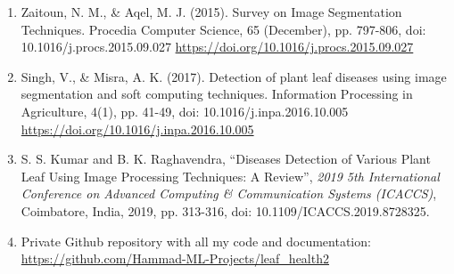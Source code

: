 \documentclass[twocolumn,10pt]{article}
\begin{document}
\begin{multicols}{2}
\begin{flushleft}
\begin{enumerate}
	\item Zaitoun, N. M., \& Aqel, M. J. (2015). Survey on Image Segmentation Techniques. Procedia Computer Science, 65 (December), pp. 797-806, doi: 10.1016/j.procs.2015.09.027 \url{https://doi.org/10.1016/j.procs.2015.09.027}
	\item Singh, V., \& Misra, A. K. (2017). Detection of plant leaf diseases using image segmentation and soft computing techniques. Information Processing in Agriculture, 4(1), pp. 41-49, doi: 10.1016/j.inpa.2016.10.005 \url{https://doi.org/10.1016/j.inpa.2016.10.005}
	\item S. S. Kumar and B. K. Raghavendra, \enquote{Diseases Detection of Various Plant Leaf Using Image Processing Techniques: A Review}, \textit{2019 5th International Conference on Advanced Computing \& Communication Systems (ICACCS)}, Coimbatore, India, 2019, pp. 313-316, doi: 10.1109/ICACCS.2019.8728325.
	\item Private Github repository with all my code and documentation: \url{https://github.com/Hammad-ML-Projects/leaf_health2}
\end{enumerate}
\end{flushleft}
\end{multicols}
\end{document}
